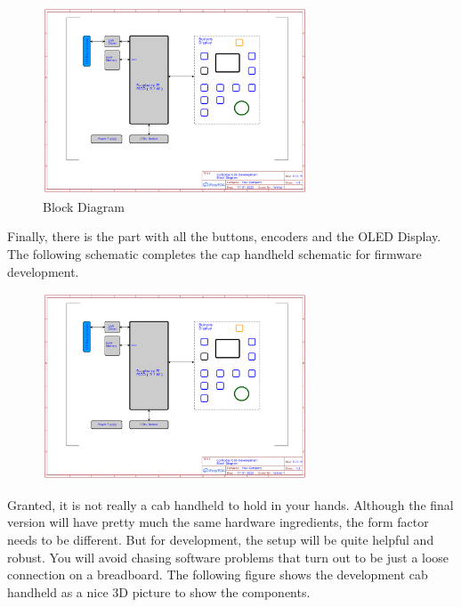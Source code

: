 \begin{figure}[htbp]
    \centering
    \includegraphics[page=2, width=0.7\textwidth]{./Schematics/Schematic_LcsNodes-Cab-Dev.pdf}
    \caption{Block Diagram}
\end{figure}
\FloatBarrier

Finally, there is the part with all the buttons, encoders and the OLED Display. The following schematic completes the cap handheld schematic for firmware development.

\begin{figure}[htbp]
    \centering
    \includegraphics[page=3, width=0.7\textwidth]{./Schematics/Schematic_LcsNodes-Cab-Dev.pdf}
\end{figure}
\FloatBarrier

Granted, it is not really a cab handheld to hold in your hands. Although the final version will have pretty much the same hardware ingredients, the form factor needs to be different. But for development, the setup will be quite helpful and robust. You will avoid chasing software problems that turn out to be just a loose connection on a breadboard. The following figure shows the development cab handheld as a nice 3D picture to show the components.

